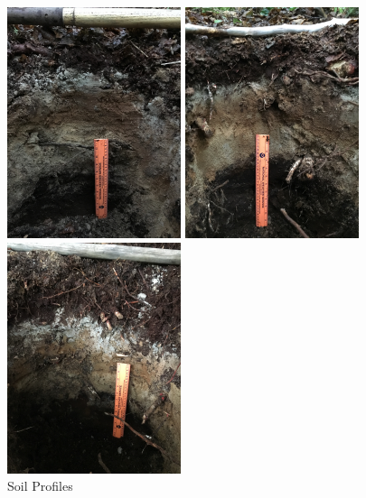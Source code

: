 \documentclass[hidelinks, 12pt]{article}
\begin{document}
\begin{figure}[H]
    \begin{minipage}{2in}
        \centering
    \includegraphics[width=2in]{pit1.jpg}
    \end{minipage}\hfill
    \begin{minipage}{2in}
        \centering
    \includegraphics[width=2in]{pit2.JPG}
    \end{minipage}\hfill
    \begin{minipage}{2in}
        \centering
    \includegraphics[width=2in]{pit3.JPG}
    \end{minipage}

    \caption{Soil Profiles}
    \label{fig:pits}
\end{figure}
\end{document}
